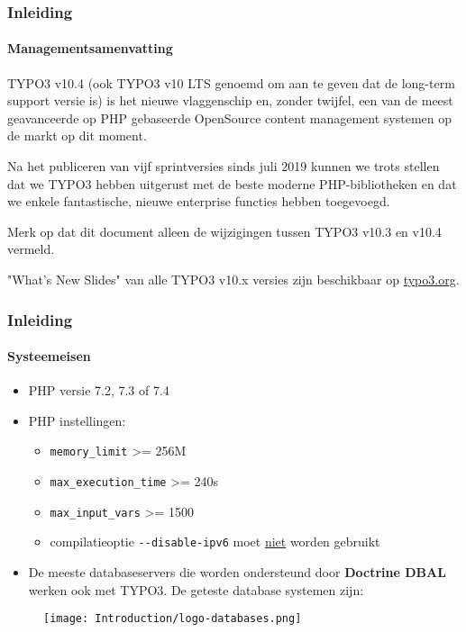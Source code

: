 \begin{frame}[fragile]
	\frametitle{Inleiding}
	\framesubtitle{Managementsamenvatting}

	\small
		TYPO3 v10.4 (ook TYPO3 v10 LTS genoemd om aan te geven dat de long-term support versie is)
		is het nieuwe vlaggenschip en, zonder twijfel, een van de meest geavanceerde op PHP gebaseerde OpenSource
		content management systemen op de markt op dit moment.

		\vspace{0.2cm}

		Na het publiceren van vijf sprintversies sinds juli 2019 kunnen we trots stellen dat we
		TYPO3 hebben uitgerust met de beste moderne PHP-bibliotheken en dat we enkele fantastische,
		nieuwe enterprise functies hebben toegevoegd.

		\vspace{0.2cm}

		Merk op dat dit document alleen de wijzigingen tussen TYPO3 v10.3 en v10.4 vermeld.

		\vspace{0.2cm}

		"What's New Slides" van alle TYPO3 v10.x versies zijn beschikbaar op
		\href{https://typo3.org/help/documentation/whats-new/}{typo3.org}.

	\normalsize

\end{frame}


\begin{frame}[fragile]
	\frametitle{Inleiding}
	\framesubtitle{Systeemeisen}

	\begin{itemize}
		\item PHP versie 7.2, 7.3 of 7.4
		\item PHP instellingen:

		\begin{itemize}
			\item \texttt{memory\_limit} >= 256M
			\item \texttt{max\_execution\_time} >= 240s
			\item \texttt{max\_input\_vars} >= 1500
			\item compilatieoptie \texttt{-}\texttt{-disable-ipv6} moet \underline{niet} worden gebruikt
		\end{itemize}

		\item De meeste databaseservers die worden ondersteund door \textbf{Doctrine DBAL} werken ook met TYPO3.
		De geteste database systemen zijn:
	\end{itemize}

	\begin{figure}
		\texttt{[image: Introduction/logo-databases.png]}
	\end{figure}

\end{frame}

